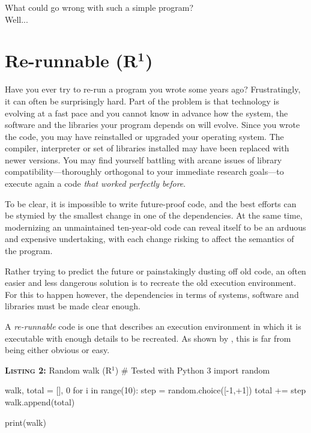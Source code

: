 \documentclass[a4paper,11pt]{article}
\begin{document}
What could go wrong with such a simple program?\\
\vfill
Well...
\vfill


\clearpage
\section*{Re-runnable (R$^{\mathbf 1}$)}

Have you ever try to re-run a program you wrote some years ago?
Frustratingly, it can often be surprisingly hard. 
Part of the problem is that technology is evolving at a fast pace
and you cannot  know in advance
how the system, the software and the libraries your program depends on will evolve.
Since you wrote the code,
you may have reinstalled or upgraded  your operating system.
The compiler, interpreter or set of libraries installed may have been replaced with newer versions. 
You may find yourself battling with
arcane issues of library compatibility---thoroughly orthogonal to your immediate research  goals---to execute again a code \emph{that worked perfectly before}. 

To be clear, it is impossible to write future-proof code,
and the best efforts can be stymied by the smallest change in one of the dependencies.
At the same time, modernizing an unmaintained ten-year-old code
can reveal itself to be an arduous and expensive undertaking,
with each change risking to affect the semantics of the program.

Rather trying to predict the future or painstakingly dusting off old code, 
an often easier and less dangerous solution is to recreate the old execution environment.
For this to happen however, 
the dependencies in terms of systems, software and libraries must be made clear enough.

A \emph{re-runnable} code is one that describes an execution environment in which it is executable with enough details to be recreated.
As shown by \citep{Collberg:2016}, this is far from being either obvious or easy.

% 
% 
%
\begin{code}{\textbf{\textsc{Listing 2:}} Random walk (R$^1$)}
# Tested with Python 3
import random

walk, total = [], 0
for i in range(10):
    step = random.choice([-1,+1])     
    total += step
    walk.append(total)
    
print(walk)
\end{code}
\end{document}
